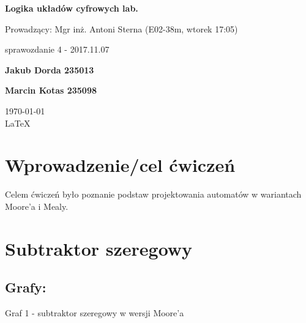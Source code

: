 \documentclass[12pt,a4paper]{article}
\begin{document}
	
	\begin{titlepage}
		
		\centering
		{\huge\bfseries Logika układów cyfrowych lab.\par}
		
		\vspace{0.5cm}
		Prowadzący: Mgr inż. Antoni Sterna (E02-38m, wtorek 17:05) \\
	
		\vspace{1.1cm}
		{\Large sprawozdanie 4 - 2017.11.07\par}
		\vfill
		
		{\large\bfseries Jakub Dorda 235013\par}
		{\large\bfseries Marcin Kotas 235098\par}
		
		\vspace{1cm}
		\today \\ \LaTeX
		
		\restoregeometry
	\end{titlepage}


	\section{Wprowadzenie/cel ćwiczeń}
	
		Celem ćwiczeń było poznanie podstaw projektowania automatów w wariantach Moore'a i Mealy.
		
		
	\section{Subtraktor szeregowy}
	
		\subsection{Grafy:}
	
			\begin{center}
				Graf 1 - subtraktor szeregowy w wersji Moore'a
			\end{center}
			
\end{document}
